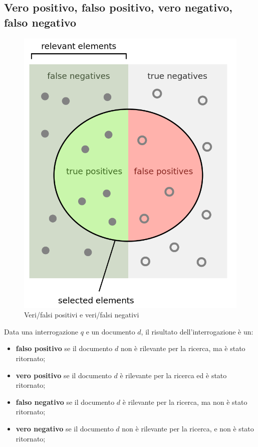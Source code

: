 \subsection{Vero positivo, falso positivo, vero negativo, falso negativo}
    \begin{figure}
        \centering
        \includegraphics[scale=0.2]{immagini/truefalsenegativepositive.png}
        \caption{Veri/falsi positivi e veri/falsi negativi}
    \end{figure}
Data una interrogazione $q$ e un documento $d$, il risultato dell'interrogazione è un:
\begin{itemize}
    \item \textbf{falso positivo} se il documento $d$ non è rilevante per la ricerca, ma è stato ritornato;
    \item \textbf{vero positivo} se il documento $d$ è rilevante per la ricerca ed è stato ritornato;
    \item \textbf{falso negativo} se il documento $d$ è rilevante per la ricerca, ma non è stato ritornato;
    \item \textbf{vero negativo} se il documento $d$ non è rilevante per la ricerca, e non è stato ritornato;
\end{itemize}

